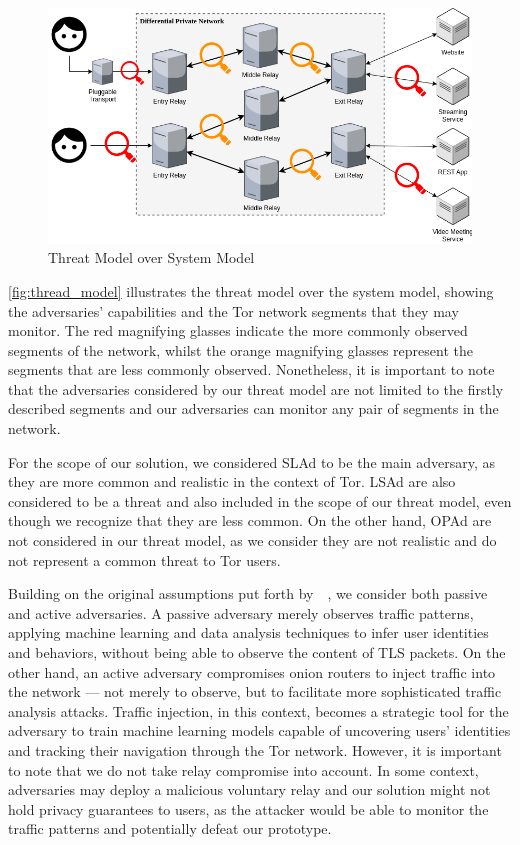 \begin{figure}[!h]
  \centering
  \includegraphics[width=\textwidth]{Chapters/Figures/Threat_Model.png}
  \caption{Threat Model over System Model}\label{fig:thread_model}
\end{figure}

\autoref{fig:thread_model} illustrates the threat model over the system model, showing the adversaries' capabilities and the Tor network segments that they may monitor. The red magnifying glasses indicate the more commonly observed segments of the network, whilst the orange magnifying glasses represent the segments that are less commonly observed. Nonetheless, it is important to note that the adversaries considered by our threat model are not limited to the firstly described segments and our adversaries can monitor any pair of segments in the network.  

For the scope of our solution, we considered SLAd to be the main adversary, as they are more common and realistic in the context of Tor. LSAd are also considered to be a threat and also included in the scope of our threat model, even though we recognize that they are less common. On the other hand, OPAd are not considered in our threat model, as we consider they are not realistic and do not represent a common threat to Tor users.

Building on the original assumptions put forth by~\citeauthor{dingledine2004tor}~\cite{dingledine2004tor}, we consider both passive and active adversaries. A passive adversary merely observes traffic patterns, applying machine learning and data analysis techniques to infer user identities and behaviors, without being able to observe the content of TLS packets. On the other hand, an active adversary compromises onion routers to inject traffic into the network — not merely to observe, but to facilitate more sophisticated traffic analysis attacks. Traffic injection, in this context, becomes a strategic tool for the adversary to train machine learning models capable of uncovering users' identities and tracking their navigation through the Tor network. However, it is important to note that we do not take relay compromise into account. In some context, adversaries may deploy a malicious voluntary relay and our solution might not hold privacy guarantees to users, as the attacker would be able to monitor the traffic patterns and potentially defeat our prototype. 


